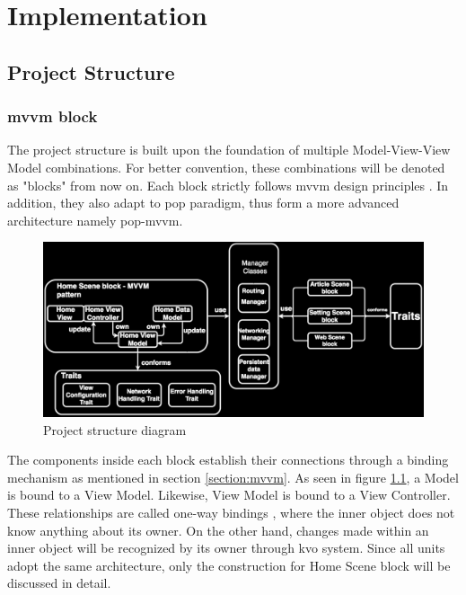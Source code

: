 \documentclass[11pt,a4paper,oneside,article]{memoir}
\begin{document}
\newpage
\chapter{Implementation}
\section{Project Structure}
\subsection{ \Gls{mvvm} block} \label{section:mvvmblock}
The project structure is built upon the foundation of multiple Model-View-View Model combinations. For better convention, these combinations will be denoted as "blocks" from now on. Each block strictly follows \gls{mvvm} design principles \cite{microsoft:mvvm}. In addition, they also adapt to \gls{pop} paradigm, thus form a more advanced architecture namely \acrfull{pop-mvvm}.

\begin{figure}[H]

\centering
\includegraphics[width=\textwidth]{project-structure-diagram}

\caption{Project structure diagram}
\label{fig:projectStructure}

\end{figure}

The components inside each block establish their connections through a binding mechanism as mentioned in section \ref{section:mvvm}. As seen in figure \ref{fig:projectStructure}, a Model is bound to a View Model. Likewise, View Model is bound to a View Controller. These relationships are called one-way bindings \cite{microsoft:databinding}, where the inner object does not know anything about its owner. On the other hand, changes made within an inner object will be recognized by its owner through \gls{kvo} system. Since all units adopt the same architecture, only the construction for Home Scene block will be discussed in detail. 
\end{document}
